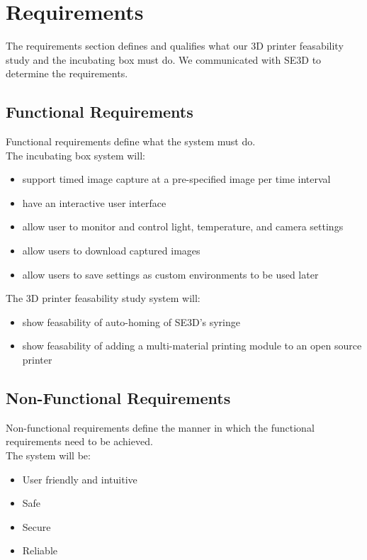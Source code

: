 \chapter{Requirements}

The requirements section defines and qualifies what our 3D printer feasability study and the incubating box must do. We communicated with SE3D to determine the requirements.

\section{Functional Requirements}

Functional requirements define what the system must do. \\
The incubating box system will:
\begin{itemize}
	\item support timed image capture at a pre-specified image per time interval
	\item have an interactive user interface
	\item allow user to monitor and control light, temperature, and camera settings
	\item allow users to download captured images
	\item allow users to save settings as custom environments to be used later
\end{itemize}


The 3D printer feasability study system will:
\begin{itemize}
	\item show feasability of auto-homing of SE3D's syringe 
	\item show feasability of adding a multi-material printing module to an open source printer
\end{itemize}



\section{Non-Functional Requirements}
Non-functional requirements define the manner in which the functional requirements need to be achieved. \\
The system will be:
\begin{itemize}
	\item User friendly and intuitive
	\item Safe
	\item Secure
	\item Reliable
\end{itemize} 


